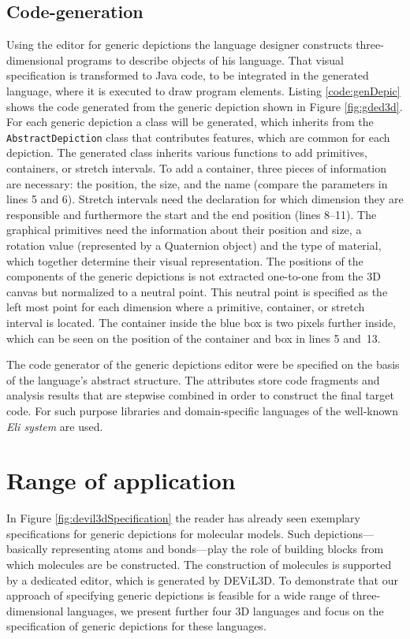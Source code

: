 \documentclass[a4paper]{article}
\newcommand{\dev}{DEViL3D\xspace}
\begin{document}
\subsection{Code-generation}
Using the editor for generic depictions the language designer constructs three-dimensional programs to describe objects of his language. That visual specification is transformed to Java code, to be integrated in the generated language, where it is executed to draw program elements. Listing \ref{code:genDepic} shows the code generated from the generic depiction shown in Figure \ref{fig:gded3d}. For each generic depiction a class will be generated, which inherits from the \texttt{AbstractDepiction} class that contributes features, which are common for each depiction. The generated class inherits various functions to add primitives, containers, or stretch intervals. To add a container, three pieces of information are necessary: the position, the size, and the name (compare the parameters in lines 5 and 6). Stretch intervals need the declaration for which dimension they are responsible and furthermore the start and the end position (lines 8--11). The graphical primitives need the information about their position and size, a rotation value (represented by a Quaternion object) and the type of material, which together determine their visual representation. The positions of the components of the generic depictions is not extracted one-to-one from the 3D canvas but normalized to a neutral point. This neutral point is specified as the left most point for each dimension where a primitive, container, or stretch interval is located. The container inside the blue box is two pixels further inside, which can be seen on the position of the container and box in lines 5 and~13.



The code generator of the generic depictions editor were be specified on the basis of the language's abstract structure. The attributes store code fragments and analysis results that are stepwise combined in order to construct the final target code. For such purpose libraries and domain-specific languages of the well-known \emph{Eli system} \cite{KPJ98} are used.



\section{Range of application}
\label{sec:rangeOfAppl}
In Figure \ref{fig:devil3dSpecification} the reader has already seen exemplary specifications for generic depictions for molecular models. Such depictions---basically representing atoms and bonds---play the role of building blocks from which molecules are be constructed. The construction of molecules is supported by a dedicated editor, which is generated by \dev. To demonstrate that our approach of specifying generic depictions is feasible for a wide range of three-dimensional languages, we present further four 3D languages and focus on the specification of generic depictions for these languages.
\end{document}
